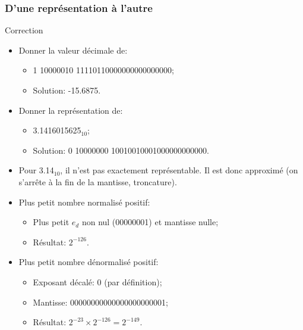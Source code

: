 \documentclass{beamer}
\begin{document}
\begin{frame}
\frametitle{D'une représentation à l'autre}
\vspace{-1.2cm}
\begin{block}{Correction}
\begin{itemize}
\item Donner la valeur décimale de:
\begin{itemize}
\item 1 10000010 11110110000000000000000;
\item Solution: -15.6875.
\end{itemize}

\item Donner la représentation de:
\begin{itemize}
\item 3.1416015625$_{10}$;
\item Solution: 0 10000000 10010010001000000000000.
\end{itemize}

\item Pour 3.14$_{10}$, il n'est pas exactement représentable. Il est donc
approximé (on s'arrête à la fin de la mantisse, troncature).

\item Plus petit nombre normalisé positif:
\begin{itemize}
\item Plus petit $e_d$ non nul (00000001) et mantisse nulle;
\item Résultat: $2^{-126}$.
\end{itemize}    

\item Plus petit nombre dénormalisé positif:
\begin{itemize}
\item Exposant décalé: 0 (par définition);
\item Mantisse: 00000000000000000000001;
\item Résultat: $2^{-23}\times{}2^{-126}=2^{-149}$.
\end{itemize}
\end{itemize}
\end{block}
\end{frame}
\end{document}
